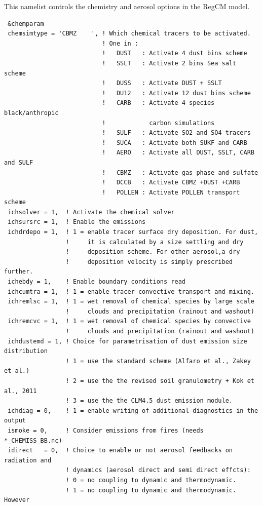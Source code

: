 This namelist controls the chemistry and aerosol options in the RegCM model.

{\footnotesize
\begin{Verbatim}
 &chemparam
 chemsimtype = 'CBMZ    ', ! Which chemical tracers to be activated.
                           ! One in :
                           !   DUST   : Activate 4 dust bins scheme
                           !   SSLT   : Activate 2 bins Sea salt scheme
                           !   DUSS   : Activate DUST + SSLT
                           !   DU12   : Activate 12 dust bins scheme
                           !   CARB   : Activate 4 species black/anthropic
                           !            carbon simulations
                           !   SULF   : Activate SO2 and SO4 tracers
                           !   SUCA   : Activate both SUKF and CARB
                           !   AERO   : Activate all DUST, SSLT, CARB and SULF
                           !   CBMZ   : Activate gas phase and sulfate
                           !   DCCB   : Activate CBMZ +DUST +CARB
                           !   POLLEN : Activate POLLEN transport scheme
 ichsolver = 1,  ! Activate the chemical solver
 ichsursrc = 1,  ! Enable the emissions
 ichdrdepo = 1,  ! 1 = enable tracer surface dry deposition. For dust,
                 !     it is calculated by a size settling and dry
                 !     deposition scheme. For other aerosol,a dry
                 !     deposition velocity is simply prescribed further.
 ichebdy = 1,    ! Enable boundary conditions read
 ichcumtra = 1,  ! 1 = enable tracer convective transport and mixing.
 ichremlsc = 1,  ! 1 = wet removal of chemical species by large scale
                 !     clouds and precipitation (rainout and washout)
 ichremcvc = 1,  ! 1 = wet removal of chemical species by convective
                 !     clouds and precipitation (rainout and washout)
 ichdustemd = 1, ! Choice for parametrisation of dust emission size distribution
                 ! 1 = use the standard scheme (Alfaro et al., Zakey et al.)
                 ! 2 = use the the revised soil granulometry + Kok et al., 2011
                 ! 3 = use the the CLM4.5 dust emission module.
 ichdiag = 0,    ! 1 = enable writing of additional diagnostics in the output
 ismoke = 0,     ! Consider emissions from fires (needs *_CHEMISS_BB.nc)
 idirect   = 0,  ! Choice to enable or not aerosol feedbacks on radiation and
                 ! dynamics (aerosol direct and semi direct effcts):
                 ! 0 = no coupling to dynamic and thermodynamic.
                 ! 1 = no coupling to dynamic and thermodynamic. However

\end{Verbatim}}
